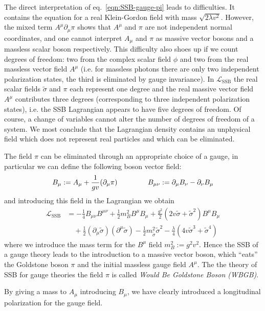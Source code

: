 \documentclass[TheoreticalPhy_ModB.tex]{subfiles}
\begin{document}
The direct interpretation of eq.~\eqref{eqn:SSB-gauge-pi} leads to difficulties. It contains the equation for a real Klein-Gordon field with mass $\sqrt{2\lambda v^2}$. However, the mixed term $A^\mu\partial_\mu\pi$ shows that $A^\mu$ and $\pi$ are not independent normal coordinates, and one cannot interpret $A_\mu$ and $\pi$ as massive vector bosons and a massless scalar boson respectively. This difficulty also shoes up if we count degrees of freedom: two from the complex scalar field $\phi$ and two from the real massless vector field $A^\mu$ (i.e. for massless photons there are only two independent polarization states, the third is eliminated by gauge invariance). In $\mathcal L_{\text{SSB}}$ the real scalar fields $\tilde\sigma$ and $\pi$ each represent one degree and the real massive vector field $A^\mu$ contributes three degrees (corresponding to three independent polarization states), i.e. the SSB Lagrangian appears to have five degrees of freedom. Of course, a change of variables cannot alter the number of degrees of freedom of a system. We most conclude that the Lagrangian density contains an unphysical field which does not represent real particles and which can be eliminated. 

The field $\pi$ can be eliminated through an appropriate choice of a gauge, in particular we can define the following boson vector field:
\[B_\mu:=A_\mu+\frac1{gv}(\partial_\mu\pi)\hspace{1.5cm}B_{\mu\nu}:=\partial_\mu B_\nu-\partial_\nu B_\mu\]
and introducing this field in the Lagrangian we obtain
\begin{equation}\label{eqn:SSB-gauge}\begin{split}
\mathcal L_{\text{SSB}}
&=-\frac14B_{\mu\nu}B^{\mu\nu}+\frac12m_B^2B^\mu B_\mu+\frac{g^2}2(2v\tilde\sigma+\tilde\sigma^2)B^\mu B_\mu\\
&\quad+\frac12(\partial_\mu\tilde\sigma)(\partial^\mu\tilde\sigma)-\frac12m_{\tilde\sigma}^2\tilde\sigma^2-\frac\lambda4(4v\tilde\sigma^3+\tilde\sigma^4)
\end{split}\end{equation}
where we introduce the mass term for the $B^\mu$ field $m_B^2:=g^2v^2$. Hence the SSB of a gauge theory leads to the introduction to a massive vector boson, which ``eats'' the Goldstone boson $\pi$ and the initial massless gauge field $A^\mu$. The the theory of SSB for gauge theories the field $\pi$ is called \emph{Would Be Goldstone Boson (WBGB)}.

By giving a mass to $A_\mu$ introducing $B_\mu$, we have clearly introduced a longitudinal polarization for the gauge field. 
\end{document}
